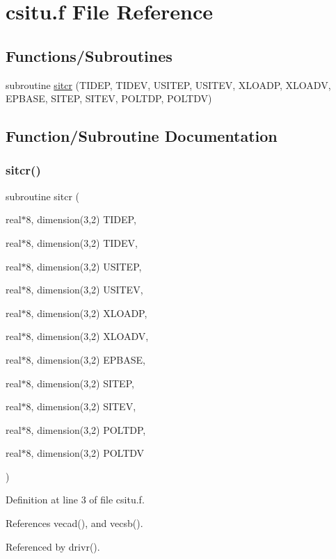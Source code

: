 \hypertarget{csitu_8f}{}\section{csitu.\+f File Reference}
\label{csitu_8f}
\subsection*{Functions/\+Subroutines}
\begin{DoxyCompactItemize}
\item 
subroutine \hyperlink{csitu_8f_a406095f0d16394fc30a2a500c7aa82ce}{sitcr} (T\+I\+D\+EP, T\+I\+D\+EV, U\+S\+I\+T\+EP, U\+S\+I\+T\+EV, X\+L\+O\+A\+DP, X\+L\+O\+A\+DV, E\+P\+B\+A\+SE, S\+I\+T\+EP, S\+I\+T\+EV, P\+O\+L\+T\+DP, P\+O\+L\+T\+DV)
\end{DoxyCompactItemize}


\subsection{Function/\+Subroutine Documentation}
\mbox{\label{csitu_8f_a406095f0d16394fc30a2a500c7aa82ce}} 
\subsubsection{\texorpdfstring{sitcr()}{sitcr()}}
{\footnotesize\ttfamily subroutine sitcr (\begin{DoxyParamCaption}\item[{real$\ast$8, dimension(3,2)}]{T\+I\+D\+EP,  }\item[{real$\ast$8, dimension(3,2)}]{T\+I\+D\+EV,  }\item[{real$\ast$8, dimension(3,2)}]{U\+S\+I\+T\+EP,  }\item[{real$\ast$8, dimension(3,2)}]{U\+S\+I\+T\+EV,  }\item[{real$\ast$8, dimension(3,2)}]{X\+L\+O\+A\+DP,  }\item[{real$\ast$8, dimension(3,2)}]{X\+L\+O\+A\+DV,  }\item[{real$\ast$8, dimension(3,2)}]{E\+P\+B\+A\+SE,  }\item[{real$\ast$8, dimension(3,2)}]{S\+I\+T\+EP,  }\item[{real$\ast$8, dimension(3,2)}]{S\+I\+T\+EV,  }\item[{real$\ast$8, dimension(3,2)}]{P\+O\+L\+T\+DP,  }\item[{real$\ast$8, dimension(3,2)}]{P\+O\+L\+T\+DV }\end{DoxyParamCaption})}



Definition at line 3 of file csitu.\+f.



References vecad(), and vecsb().



Referenced by drivr().

